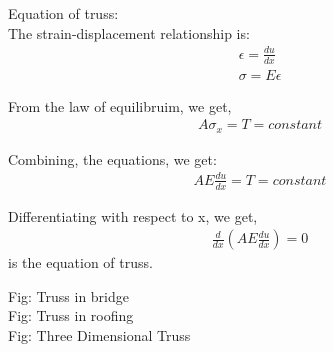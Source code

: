 \documentclass[a4paper,15pt]{article}
\begin{document}
   Equation of truss: \\
   
   The strain-displacement relationship is: \\
   \begin{eqnarray}
		   	\epsilon = \frac{du}{dx}\\
		   	\sigma = E\epsilon
   \end{eqnarray}

   From the law of equilibruim, we get,
   \begin{eqnarray}
   	A\sigma_x = T = constant
   \end{eqnarray}
   						
   Combining, the equations, we get:
   \begin{eqnarray}
   			AE\frac{du}{dx} = T = constant
   \end{eqnarray}
   						
   Differentiating with respect to x, we get,
   \begin{eqnarray}
   				\frac{d}{dx}(AE\frac{du}{dx}) = 0
   \end{eqnarray}
  						 is the equation of truss.
   
   Fig:  Truss in bridge\\
   
   Fig:  Truss in roofing\\
   
   Fig: Three Dimensional Truss\\
   
   
\end{document}
